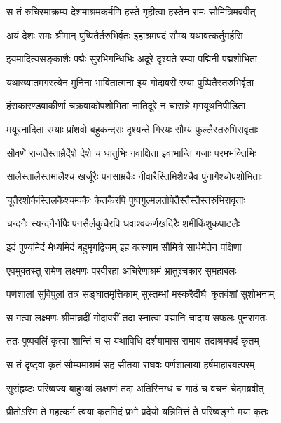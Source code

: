 \twolineshloka
{स तं रुचिरमाक्रम्य देशमाश्रमकर्मणि}
{हस्ते गृहीत्वा हस्तेन रामः सौमित्रिमब्रवीत्} %

\twolineshloka
{अयं देशः समः श्रीमान् पुष्पितैर्तरुभिर्वृतः}
{इहाश्रमपदं सौम्य यथावत्कर्तुमर्हसि} %

\twolineshloka
{इयमादित्यसङ्काशैः पद्मैः सुरभिगन्धिभिः}
{अदूरे दृश्यते रम्या पद्मिनी पद्मशोभिता} %

\twolineshloka
{यथाख्यातमगस्त्येन मुनिना भावितात्मना}
{इयं गोदावरी रम्या पुष्पितैस्तरुभिर्वृता} %

\twolineshloka
{हंसकारण्डवाकीर्णा चक्रवाकोपशोभिता}
{नातिदूरे न चासन्ने मृगयूथनिपीडिता} %

\twolineshloka
{मयूरनादिता रम्याः प्रांशवो बहुकन्दराः}
{दृश्यन्ते गिरयः सौम्य फुल्लैस्तरुभिरावृताः} %

\twolineshloka
{सौवर्णे राजतैस्ताम्रैर्देशे देशे च धातुभिः}
{गवाक्षिता इवाभान्ति गजाः परमभक्तिभिः} %

\twolineshloka
{सालैस्तालैस्तमालैश्च खर्जूरैः पनसाम्रकैः}
{नीवारैस्तिमिशैश्चैव पुंनागैश्चोपशोभिताः} %

\twolineshloka
{चूतैरशोकैस्तिलकैश्चम्पकैः केतकैरपि}
{पुष्पगुल्मलतोपेतैस्तैस्तैस्तरुभिरावृताः} %

\twolineshloka
{चन्दनैः स्यन्दनैर्नीपैः पनसैर्लकुचैरपि}
{धवाश्वकर्णखदिरैः शमीकिंशुकपाटलैः} %

\twolineshloka
{इदं पुण्यमिदं मेध्यमिदं बहुमृगद्विजम्}
{इह वत्स्याम सौमित्रे सार्धमेतेन पक्षिणा} %

\twolineshloka
{एवमुक्तस्तु रामेण लक्ष्मणः परवीरहा}
{अचिरेणाश्रमं भ्रातुश्चकार सुमहाबलः} %

\twolineshloka
{पर्णशालां सुविपुलां तत्र सङ्घातमृत्तिकाम्}
{सुस्तम्भां मस्करैर्दीर्घैः कृतवंशां सुशोभनाम्} %

\twolineshloka
{स गत्वा लक्ष्मणः श्रीमान्नदीं गोदावरीं तदा}
{स्नात्वा पद्मानि चादाय सफलः पुनरागतः} %

\twolineshloka
{ततः पुष्पबलिं कृत्वा शान्तिं च स यथाविधि}
{दर्शयामास रामाय तदाश्रमपदं कृतम्} %

\twolineshloka
{स तं दृष्ट्वा कृतं सौम्यमाश्रमं सह सीतया}
{राघवः पर्णशालायां हर्षमाहारयत्परम्} %

\twolineshloka
{सुसंहृष्टः परिष्वज्य बाहुभ्यां लक्ष्मणं तदा}
{अतिस्निग्धं च गाढं च वचनं चेदमब्रवीत्} %

\twolineshloka
{प्रीतोऽस्मि ते महत्कर्म त्वया कृतमिदं प्रभो}
{प्रदेयो यन्निमित्तं ते परिष्वङ्गो मया कृतः} %

